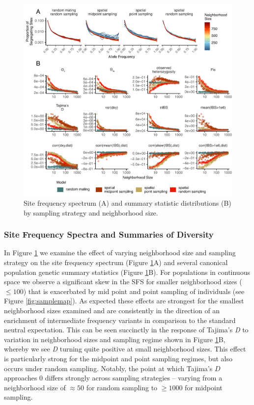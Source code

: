 \documentclass[11pt,twoside,lineno]{preprint}
\begin{document}
\begin{figure}[p]
\centering
\includegraphics[width=\textwidth]{figures/sfs_w_sumstats.pdf}
\caption{Site frequency spectrum (A) and summary statistic distributions (B) by sampling strategy and neighborhood size.}
\label{fig:sumstats}
\end{figure}


\subsubsection{Site Frequency Spectra and Summaries of Diversity}
In Figure \ref{fig:sumstats} we examine the effect of varying neighborhood size and sampling strategy on the site frequency spectrum (Figure \ref{fig:sumstats}A) and several canonical population genetic summary statistics (Figure \ref{fig:sumstats}B). For populations in continuous space we observe a significant skew in the SFS for smaller neighborhood sizes ($\leq 100$) that is exacerbated by mid point and point sampling of individuals (see Figure \ref{fig:samplemap}). As expected these effects are strongest for the smallest neighborhood sizes examined and are consistently in the direction of an enrichment of intermediate frequency variants in comparison to the standard neutral expectation. This can be seen succinctly in the response of Tajima's \textit{D} to variation in neighborhood sizes and sampling regime shown in Figure \ref{fig:sumstats}B, whereby we see \textit{D} turning quite positive at small neighborhood sizes. This effect is particularly strong for the midpoint and point sampling regimes, but also occurs under random sampling. Notably, the point at which Tajima's $D$ approaches 0 differs strongly across sampling strategies -- varying from a neighborhood size of $\approx50$ for random sampling to $\geq1000$ for midpoint sampling. 
\end{document}
